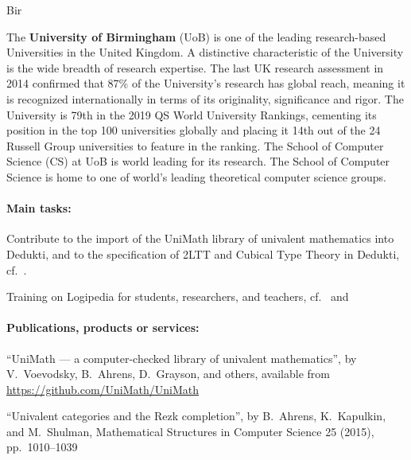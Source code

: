 \begin{sitedescription}{Bir}


The \textbf{University of Birmingham} (UoB) is one of the leading research-based Universities in the United Kingdom. A distinctive
characteristic of the University is the wide breadth of research expertise. The last UK research assessment in 2014 confirmed that
87\% of the University’s research has global reach, meaning it is recognized internationally in terms of its originality, significance and rigor. The University is 79th in the 2019 QS World University Rankings, cementing its position in the top 100 universities globally and placing it 14th out of the 24 Russell Group universities to feature in the ranking. The School of Computer Science (CS) at UoB is world leading for its research. 
The School of Computer Science is home to one of world's leading theoretical computer science groups.

\paragraph*{Main tasks:}

\begin{compactitem}
\item Contribute to the import of the UniMath library of univalent mathematics into Dedukti, and to the specification of 2LTT and Cubical Type Theory in Dedukti, cf.\ .
\item Training on Logipedia for students, researchers, and teachers, cf.\  and 

\end{compactitem}

\paragraph*{Publications, products or services:}

\begin{compactitem}
 \item ``UniMath --- a computer-checked library of univalent mathematics'', by V.~Voevodsky, B.~Ahrens, D.~Grayson, and others, available from \url{https://github.com/UniMath/UniMath}
 \item ``Univalent categories and the Rezk completion'', by B.~Ahrens, K.~Kapulkin, and M.~Shulman, Mathematical Structures in Computer Science 25 (2015), pp.~1010--1039
\end{compactitem}


\end{sitedescription}
